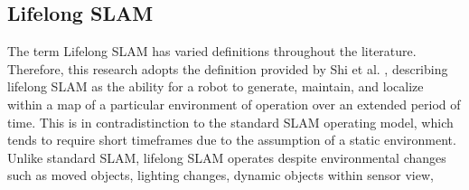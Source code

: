 \subsection{Lifelong SLAM}

The term Lifelong SLAM has varied definitions throughout the literature. Therefore, this research adopts the definition provided by Shi et al. \cite{shiAreWeReady2020}, describing lifelong SLAM as the ability for a robot to generate, maintain, and localize within a map of a particular environment of operation over an extended period of time. This is in contradistinction to the standard SLAM operating model, which tends to require short timeframes due to the assumption of a static environment. Unlike standard SLAM, lifelong SLAM operates despite environmental changes such as moved objects, lighting changes, dynamic objects within sensor view, 